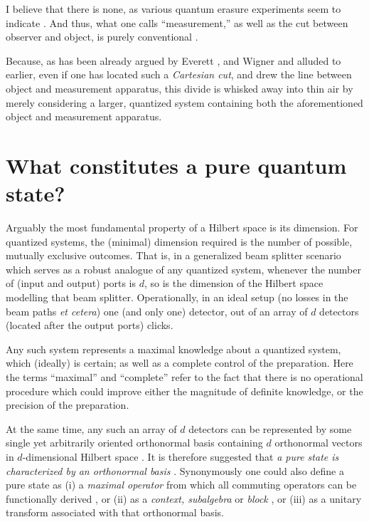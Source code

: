 \documentclass[%
 preprint,
 showpacs,
 showkeys,
 preprintnumbers,
 amsmath,amssymb,
 aps,
  pra,
  longbibliography,
 ]{revtex4-1}
\begin{document}
I believe that there is none,
as various quantum erasure experiments seem to indicate
\citep{PhysRevD.22.879,PhysRevA.25.2208,greenberger2,Nature351,Zajonc-91,PhysRevA.45.7729,PhysRevLett.73.1223,PhysRevLett.75.3783,hkwz}.
And thus,
what one calls ``measurement,''
as well as the cut between observer and object, is purely conventional \cite{svozil-2001-convention}.

Because, as has been already argued by  Everett \cite[p.~454]{everett}, and Wigner \cite[p.~173]{wigner:mb} and alluded to earlier,
even if one has located such a {\em Cartesian cut}, and drew the line between object and measurement apparatus,
this divide is whisked away into thin air by merely considering a larger, quantized system containing both the
aforementioned  object  and measurement apparatus.


\section{What constitutes a pure quantum state?}

Arguably the most fundamental property of a Hilbert space is its dimension.
For quantized systems, the (minimal) dimension required is the number of possible, mutually exclusive outcomes.
That is, in a generalized beam splitter scenario \cite{rzbb} which serves as a robust analogue of any quantized system,
whenever the number of (input and output) ports is $d$, so is the dimension of the Hilbert space modelling that beam splitter.
Operationally, in an ideal setup (no losses in the beam paths {\it et cetera}) one (and only one) detector, out of an array of $d$ detectors
(located after the output ports) clicks.

Any such system represents a maximal knowledge about a quantized system, which (ideally) is certain;
as well as a complete control of the preparation.
Here the terms ``maximal'' and ``complete'' refer to the fact that there is no operational procedure which could improve either the magnitude of definite knowledge,
or the precision of the preparation.

At the same time, any such an array of $d$ detectors can be represented by some single yet arbitrarily oriented orthonormal basis
containing $d$ orthonormal vectors in $d$-dimensional Hilbert space  \cite{Schwinger.60}.
It is therefore suggested that {\em a pure state is characterized by  an orthonormal basis} \cite{svozil-2002-statepart-prl}.
Synonymously one could also define a pure state as
(i) a {\em maximal operator}  from which all commuting operators can be functionally derived
\cite[sect.~84]{halmos-vs}, or
(ii) as a {\em context, subalgebra} or {\em block} \cite{svozil-2006-omni,svozil-2008-ql}, or
(iii) as a unitary transform associated with that orthonormal basis.
\end{document}
